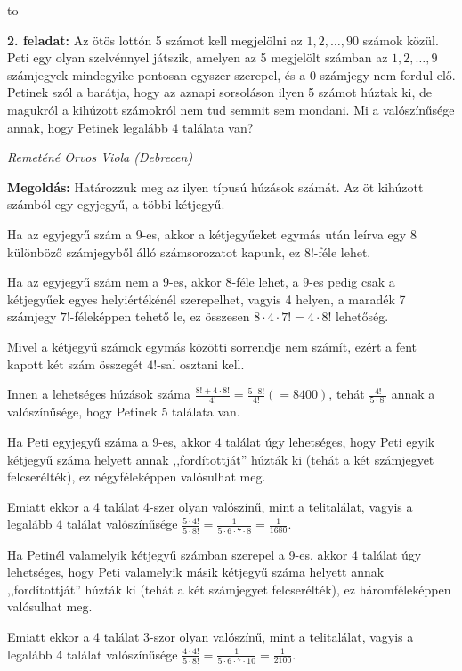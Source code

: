 \documentclass[a4paper,10pt]{article}
\newcommand{\ki}[2]{\hfill {\it #1 (#2)}\medskip}
\newcommand{\vonal}{\hbox to \hsize{\hskip2truecm\hrulefill\hskip2truecm}}
\begin{document}
\vonal

{\bf 2. feladat: } Az ötös lottón 5 számot kell megjelölni az
$1,2,\dots,90$ számok közül. Peti egy olyan szelvénnyel játszik, amelyen az 5
megjelölt számban  az $1,2,\dots,9$ számjegyek mindegyike pontosan egyszer
szerepel, és a 0 számjegy nem fordul elő. Petinek szól a barátja, hogy
az aznapi sorsoláson ilyen 5 számot húztak ki, de magukról a kihúzott
számokról nem tud semmit sem mondani. Mi a valószínűsége annak, hogy
Petinek legalább 4 találata van?

\ki{Remeténé Orvos Viola}{Debrecen}\medskip

{\bf Megoldás:} Határozzuk meg az ilyen típusú húzások számát. 
Az öt kihúzott
számból egy egyjegyű, a többi kétjegyű. 

\medskip
\noindent
Ha az egyjegyű szám a 9-es, akkor
a kétjegyűeket egymás után leírva egy 8 különböző számjegyből álló 
számsorozatot kapunk, ez $8!$-féle lehet. 

\medskip
\noindent
Ha az egyjegyű szám nem a 9-es, akkor 8-féle lehet, a 9-es pedig csak a
kétjegyűek egyes helyiértékénél szerepelhet, vagyis 4 helyen, a maradék 7
számjegy $7!$-féleképpen tehető le, ez összesen $8\cdot4\cdot7!=4\cdot8!$ 
lehetőség. 

\medskip
\noindent
Mivel a kétjegyű számok egymás közötti sorrendje nem számít, ezért a fent
kapott két szám összegét $4!$-sal osztani kell. 

\medskip
\noindent
Innen a lehetséges húzások száma $\displaystyle \frac{8!+4\cdot8!}{4!}=\frac{5\cdot8!}{4!}(=8400)$, tehát $\displaystyle \frac{4!}{5\cdot 8!}$ annak a valószínűsége, hogy
Petinek 5 találata van.

\medskip
\noindent
Ha Peti egyjegyű száma a 9-es, akkor 4 találat úgy lehetséges, hogy Peti 
egyik kétjegyű száma helyett annak ,,fordítottját'' húzták ki (tehát a két 
számjegyet felcserélték), ez négyféleképpen valósulhat meg.


\medskip
\noindent
Emiatt ekkor a 4 találat 4-szer olyan valószínű, mint a telitalálat, 
vagyis a legalább 4 találat valószínűsége $\displaystyle
\frac{5\cdot4!}{5\cdot8!}=\frac{1}{5\cdot6\cdot7\cdot8}=\frac{1}{1680}$. 


\medskip
\noindent
Ha Petinél valamelyik kétjegyű számban szerepel a 9-es, akkor 4 találat úgy 
lehetséges, hogy Peti valamelyik másik kétjegyű száma helyett annak 
,,fordítottját'' húzták ki (tehát a két számjegyet felcserélték), ez
háromféleképpen valósulhat meg. 


\medskip
\noindent
Emiatt ekkor a 4 találat 3-szor olyan valószínű, mint a telitalálat, 
vagyis a legalább 4 találat valószínűsége $\displaystyle
\frac{4\cdot4!}{5\cdot8!}=\frac{1}{5\cdot6\cdot7\cdot10}=\frac{1}{2100}$. 
\end{document}
